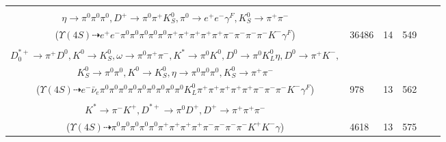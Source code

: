 \documentclass[landscape]{article}
\newcounter{rownumbers}
\newcommand\rn{\stepcounter{rownumbers}\arabic{rownumbers}}
\newcommand{\EOLP}{\\ \hline} %
\newcommand{\topoTags}[1]{#1} %
\begin{document}
\begin{longtable}{clcccc}
\rn & \makecell[l]{ $ 
\Upsilon(4S) \rightarrow \bar{B}^{0} \bar{B}^{0} ,
\bar{B}^{0} \rightarrow \omega K_2^{*0} ,
\bar{B}^{0} \rightarrow \pi^{0} \pi^{0} \rho^{0} \pi^{-} \eta D^{+} ,
\omega \rightarrow \pi^{+} \pi^{-} ,
K_2^{*0} \rightarrow \pi^{+} K^{-} ,
\rho^{0} \rightarrow \pi^{+} \pi^{-} ,
$ \\ $
\eta \rightarrow \pi^{0} \pi^{0} \pi^{0} ,
D^{+} \rightarrow \pi^{0} \pi^{+} K_{S}^{0} ,
\pi^{0} \rightarrow e^{+} e^{-} \gamma^{F} ,
K_{S}^{0} \rightarrow \pi^{+} \pi^{-} 
$ \\ ($
\Upsilon(4S) \dashrightarrow e^{+} e^{-} \pi^{0} \pi^{0} \pi^{0} \pi^{0} \pi^{0} \pi^{+} \pi^{+} \pi^{+} \pi^{+} \pi^{+} \pi^{-} \pi^{-} \pi^{-} \pi^{-} K^{-} \gamma^{F} 
$) } & \topoTags{36486 & }14 & 549 \EOLP

\rn & \makecell[l]{ $ 
\Upsilon(4S) \rightarrow B^{0} \bar{B}^{0} ,
B^{0} \rightarrow K^{*+} D^{-} D^{*0} ,
\bar{B}^{0} \rightarrow e^{-} \bar{\nu}_{e} D_{0}^{*+} ,
K^{*+} \rightarrow \pi^{+} K^{0} \gamma^{F} ,
D^{-} \rightarrow \pi^{-} \omega K^{*} ,
D^{*0} \rightarrow \pi^{0} D^{0} ,
$ \\ $
D_{0}^{*+} \rightarrow \pi^{+} D^{0} ,
K^{0} \rightarrow K_{S}^{0} ,
\omega \rightarrow \pi^{0} \pi^{+} \pi^{-} ,
K^{*} \rightarrow \pi^{0} K^{0} ,
D^{0} \rightarrow \pi^{0} K_{L}^{0} \eta ,
D^{0} \rightarrow \pi^{+} K^{-} ,
$ \\ $
K_{S}^{0} \rightarrow \pi^{0} \pi^{0} ,
K^{0} \rightarrow K_{S}^{0} ,
\eta \rightarrow \pi^{0} \pi^{0} \pi^{0} ,
K_{S}^{0} \rightarrow \pi^{+} \pi^{-} 
$ \\ ($
\Upsilon(4S) \dashrightarrow e^{-} \bar{\nu}_{e} \pi^{0} \pi^{0} \pi^{0} \pi^{0} \pi^{0} \pi^{0} \pi^{0} \pi^{0} \pi^{0} K_{L}^{0} \pi^{+} \pi^{+} \pi^{+} \pi^{+} \pi^{+} \pi^{-} \pi^{-} \pi^{-} K^{-} \gamma^{F} 
$) } & \topoTags{978 & }13 & 562 \EOLP

\rn & \makecell[l]{ $ 
\Upsilon(4S) \rightarrow \bar{B}^{0} \bar{B}^{0} ,
\bar{B}^{0} \rightarrow \pi^{-} D^{+} ,
\bar{B}^{0} \rightarrow \pi^{-} \rho^{+} \omega K^{*} K^{-} D^{*+} ,
D^{+} \rightarrow \pi^{0} \pi^{0} \pi^{+} ,
\rho^{+} \rightarrow \pi^{0} \pi^{+} ,
\omega \rightarrow \pi^{0} \gamma ,
$ \\ $
K^{*} \rightarrow \pi^{-} K^{+} ,
D^{*+} \rightarrow \pi^{0} D^{+} ,
D^{+} \rightarrow \pi^{+} \pi^{+} \pi^{-} 
$ \\ ($
\Upsilon(4S) \dashrightarrow \pi^{0} \pi^{0} \pi^{0} \pi^{0} \pi^{0} \pi^{+} \pi^{+} \pi^{+} \pi^{+} \pi^{-} \pi^{-} \pi^{-} \pi^{-} K^{+} K^{-} \gamma 
$) } & \topoTags{4618 & }13 & 575 \EOLP


\end{longtable}
\end{document}
